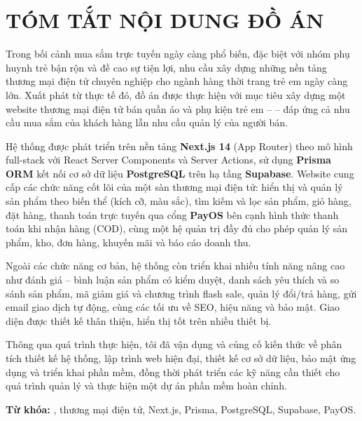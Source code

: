 \chapter*{TÓM TẮT NỘI DUNG ĐỒ ÁN}

Trong bối cảnh mua sắm trực tuyến ngày càng phổ biến, đặc biệt với nhóm phụ huynh trẻ
bận rộn và đề cao sự tiện lợi, nhu cầu xây dựng những nền tảng thương mại điện tử chuyên
nghiệp cho ngành hàng thời trang trẻ em ngày càng lớn. Xuất phát từ thực tế đó, đồ án được
thực hiện với mục tiêu xây dựng một website thương mại điện tử bán quần áo và phụ kiện trẻ
em -- \brandName{} -- đáp ứng cả nhu cầu mua sắm của khách hàng lẫn nhu cầu quản lý của
người bán.

Hệ thống được phát triển trên nền tảng \textbf{Next.js 14} (App Router) theo mô hình
full-stack với React Server Components và Server Actions, sử dụng \textbf{Prisma ORM} kết nối
cơ sở dữ liệu \textbf{PostgreSQL} trên hạ tầng \textbf{Supabase}. Website cung cấp các chức năng
cốt lõi của một sàn thương mại điện tử: hiển thị và quản lý sản phẩm theo biến thể (kích cỡ,
màu sắc), tìm kiếm và lọc sản phẩm, giỏ hàng, đặt hàng, thanh toán trực tuyến qua cổng
\textbf{PayOS} bên cạnh hình thức thanh toán khi nhận hàng (COD), cùng một hệ quản trị đầy đủ
cho phép quản lý sản phẩm, kho, đơn hàng, khuyến mãi và báo cáo doanh thu.

Ngoài các chức năng cơ bản, hệ thống còn triển khai nhiều tính năng nâng cao như đánh giá --
bình luận sản phẩm có kiểm duyệt, danh sách yêu thích và so sánh sản phẩm, mã giảm giá và
chương trình flash sale, quản lý đổi/trả hàng, gửi email giao dịch tự động, cùng các tối ưu về
SEO, hiệu năng và bảo mật. Giao diện được thiết kế thân thiện, hiển thị tốt trên nhiều thiết bị.

Thông qua quá trình thực hiện, tôi đã vận dụng và củng cố kiến thức về phân tích thiết kế hệ
thống, lập trình web hiện đại, thiết kế cơ sở dữ liệu, bảo mật ứng dụng và triển khai phần mềm,
đồng thời phát triển các kỹ năng cần thiết cho quá trình quản lý và thực hiện một dự án phần mềm
hoàn chỉnh.

\vspace{8pt}
\noindent\textbf{Từ khóa:} \brandName, thương mại điện tử, Next.js, Prisma, PostgreSQL,
Supabase, PayOS.
